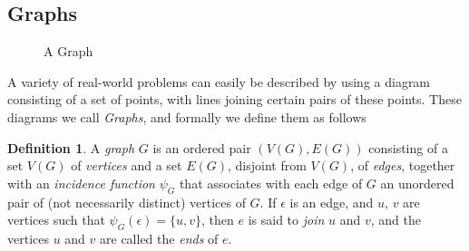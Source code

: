 \documentclass[11pt,letterpaper]{article}
\theoremstyle{definition}
\newtheorem{defn}{Definition}[section]
\begin{document}
\subsection{Graphs}
\begin{figure}
    \centering
    \caption{A Graph}\label{fig:graph}
\end{figure}
A variety of real-world problems can easily be described by using a diagram consisting of a set of points, with lines joining certain pairs of these points.\autocite{bondy_murty_2008} These diagrams we call \emph{Graphs}, and formally we define them as follows
\begin{defn}\label{def:graph}
    A \emph{graph} \(G\) is an ordered pair \((V(G), E(G))\) consisting of a set \(V(G)\) of \emph{vertices} and a set \(E(G)\), disjoint from \(V(G)\), of \emph{edges}, together with an \emph{incidence function} \(\psi_G\) that associates with each edge of \(G\) an unordered pair of (not necessarily distinct) vertices of \(G\). If \(\epsilon \) is an edge, and \(u\), \(v\) are vertices such that \(\psi_G(\epsilon)=\{u,v\} \), then \(e\) is said to \emph{join} \(u\) and \(v\), and the vertices \(u\) and \(v\) are called the \emph{ends} of \(e\).\autocite{bondy_murty_2008}
\end{defn}
\end{document}
